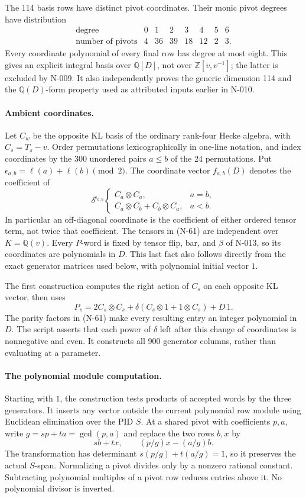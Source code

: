 The 114 basis rows have distinct pivot coordinates.  Their
monic pivot degrees have distribution
\[
\begin{array}{c|rrrrrrr}
\text{degree}&0&1&2&3&4&5&6\\\hline
\text{number of pivots}&4&36&39&18&12&2&3.
\end{array}
 \tag{N-60}
\]
Every coordinate polynomial of every final row has degree at
most eight.  This gives an explicit integral basis over
$\mathbb Q[D]$, not over $\mathbb Z[v,v^{-1}]$; the latter
is excluded by N-009.  It also independently proves the
generic dimension 114 and the $\mathbb Q(D)$-form property
used as attributed inputs earlier in N-010.

\paragraph{Ambient coordinates.}
Let $C_w$ be the opposite KL basis of the ordinary rank-four
Hecke algebra, with $C_s=T_s-v$.  Order permutations
lexicographically in one-line notation, and index coordinates
by the 300 unordered pairs $a\le b$ of the 24 permutations.
Put $\epsilon_{a,b}=\ell(a)+\ell(b)\pmod2$.  The coordinate
vector $f_{a,b}(D)$ denotes the coefficient of
\[
 \delta^{\epsilon_{a,b}}\begin{cases}
 C_a\otimes C_a,&a=b,\\
 C_a\otimes C_b+C_b\otimes C_a,&a<b.
 \end{cases}
 \tag{N-61}
\]
In particular an off-diagonal coordinate is the coefficient
of either ordered tensor term, not twice that coefficient.
The tensors in (N-61) are independent over $K=\mathbb Q(v)$.
Every $P$-word is fixed by tensor flip, bar, and $\beta$ of
N-013, so its coordinates are polynomials in $D$.  This last
fact also follows directly from the exact generator matrices
used below, with polynomial initial vector $1$.

The first construction computes the right action of $C_s$
on each opposite KL vector, then uses
\[
 P_s=2C_s\otimes C_s+
       \delta(C_s\otimes1+1\otimes C_s)+D\,1.
 \tag{N-62}
\]
The parity factors in (N-61) make every resulting entry an
integer polynomial in $D$.  The script asserts that each
power of $\delta$ left after this change of coordinates is
nonnegative and even.  It constructs all 900 generator
columns, rather than evaluating at a parameter.

\paragraph{The polynomial module computation.}
Starting with $1$, the construction tests products of accepted
words by the three generators.  It inserts any vector outside
the current polynomial row module using Euclidean elimination
over the PID $S$.  At a shared pivot with coefficients $p,a$,
write $g=sp+ta=\gcd(p,a)$ and replace the two rows $b,x$ by
\[
           sb+tx,\qquad (p/g)x-(a/g)b.
 \tag{N-63}
\]
The transformation has determinant
$s(p/g)+t(a/g)=1$, so it preserves the actual $S$-span.
Normalizing a pivot divides only by a nonzero rational
constant.  Subtracting polynomial multiples of a pivot row
reduces entries above it.  No polynomial divisor is inverted.

